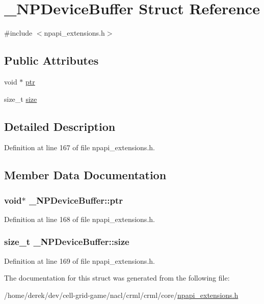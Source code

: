 \hypertarget{struct___n_p_device_buffer}{
\section{\_\-NPDeviceBuffer Struct Reference}
\label{struct___n_p_device_buffer}
}


{\ttfamily \#include $<$npapi\_\-extensions.h$>$}

\subsection*{Public Attributes}
\begin{DoxyCompactItemize}
\item 
void $\ast$ \hyperlink{struct___n_p_device_buffer_a89f9f8addfb4c8f6d10075cdd48224da}{ptr}
\item 
size\_\-t \hyperlink{struct___n_p_device_buffer_a78f49f429889466fc50ce924ec8ea515}{size}
\end{DoxyCompactItemize}


\subsection{Detailed Description}


Definition at line 167 of file npapi\_\-extensions.h.



\subsection{Member Data Documentation}
\hypertarget{struct___n_p_device_buffer_a89f9f8addfb4c8f6d10075cdd48224da}{
\subsubsection[{ptr}]{\setlength{\rightskip}{0pt plus 5cm}void$\ast$ {\bf \_\-NPDeviceBuffer::ptr}}}
\label{struct___n_p_device_buffer_a89f9f8addfb4c8f6d10075cdd48224da}


Definition at line 168 of file npapi\_\-extensions.h.

\hypertarget{struct___n_p_device_buffer_a78f49f429889466fc50ce924ec8ea515}{
\subsubsection[{size}]{\setlength{\rightskip}{0pt plus 5cm}size\_\-t {\bf \_\-NPDeviceBuffer::size}}}
\label{struct___n_p_device_buffer_a78f49f429889466fc50ce924ec8ea515}


Definition at line 169 of file npapi\_\-extensions.h.



The documentation for this struct was generated from the following file:\begin{DoxyCompactItemize}
\item 
/home/derek/dev/cell-\/grid-\/game/nacl/crml/crml/core/\hyperlink{npapi__extensions_8h}{npapi\_\-extensions.h}\end{DoxyCompactItemize}
